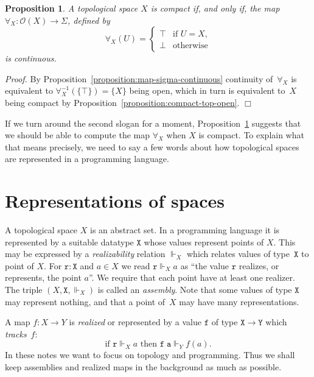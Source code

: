 \documentclass[a4paper,10pt]{article}
\newtheorem{proposition}[theorem]{Proposition}
\newenvironment{proof}{\par\noindent\textit{Proof.}}{\hfill$\Box$\par\medskip}
\newcommand{\set}[1]{\{#1\}}
\newcommand{\tpl}[1]{\mathcal{O}(#1)}
\newcommand{\R}[1]{\mathtt{#1}}
\newcommand{\rz}{\Vdash}
\begin{document}
\begin{proposition}
  \label{proposition:compact-iff-forall-continuous}
  A topological space $X$ is compact if, and only if, the map
  $\forall_X : \tpl{X} \to \Sigma$, defined by
  \begin{equation*}
    \forall_X(U) =
    \begin{cases}
      \top & \text{if $U = X$,}\\
      \bot & \text{otherwise}
    \end{cases}    
  \end{equation*}
  is continuous.
\end{proposition}

\begin{proof}
  By Proposition~\ref{proposition:map-sigma-continuous} continuity
  of~$\forall_X$ is equivalent to $\forall_X^{-1}(\set{\top}) =
  \set{X}$ being open, which in turn is equivalent to~$X$ being
  compact by Proposition~\ref{proposition:compact-top-open}.
\end{proof}

If we turn around the second slogan for a moment,
Proposition~\ref{proposition:compact-iff-forall-continuous} suggests
that we should be able to compute the map $\forall_X$ when $X$ is
compact. To explain what that means precisely, we need to say a few
words about how topological spaces are represented in a programming
language.

\section{Representations of spaces}
\label{sec:representations}

A topological space $X$ is an abstract set. In a programming language
it is represented by a suitable datatype $\mathtt{X}$ whose values
represent points of $X$. This may be expressed by a
\emph{realizability} relation $\rz_X$ which relates values of
type~$\mathtt{X}$ to point of $X$. For $\R{r} : \mathtt{X}$ and $a \in
X$ we read $\R{r} \rz_X a$ as ``the value $\R{r}$ realizes, or
represents, the point $a$''. We require that each point have at least
one realizer. The triple $(X, \mathtt{X}, {\rz_X})$ is called an
\emph{assembly}. Note that some values of type $\mathtt{X}$ may
represent nothing, and that a point of~$X$ may have many
representations.

A map $f : X \to Y$ is \emph{realized} or represented by a value
$\R{f}$ of type $\mathtt{X} \to \mathtt{Y}$ which \emph{tracks}~$f$:
%
\begin{equation*}
  \text{if $\R{r} \rz_X a$ then $\R{f}\;\R{a} \rz_Y f(a)$.}
\end{equation*}
%
In these notes we want to focus on topology and programming. Thus we
shall keep assemblies and realized maps in the background as much as
possible.
\end{document}
